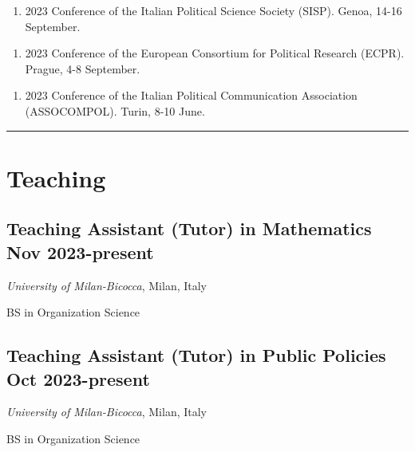 \documentclass[10pt,]{article}
\providecommand{\tightlist}{%
  \setlength{\itemsep}{0pt}\setlength{\parskip}{0pt}}
\renewenvironment{itemize}{
  \begin{list}{}{
    \setlength{\leftmargin}{1.5em}
  }
}{
  \end{list}
}
\begin{document}
\begin{enumerate}
\def\labelenumi{\arabic{enumi}.}
\setcounter{enumi}{2}
\tightlist
\item
  2023 Conference of the Italian Political Science Society (SISP).
  Genoa, 14-16 September.
\end{enumerate}

\begin{enumerate}
\def\labelenumi{\arabic{enumi}.}
\setcounter{enumi}{1}
\tightlist
\item
  2023 Conference of the European Consortium for Political Research
  (ECPR). Prague, 4-8 September.
\end{enumerate}

\begin{enumerate}
\def\labelenumi{\arabic{enumi}.}
\tightlist
\item
  2023 Conference of the Italian Political Communication Association
  (ASSOCOMPOL). Turin, 8-10 June.
\end{enumerate}

\bigskip \hrule

\section{Teaching}\label{teaching}

\subsection{\texorpdfstring{Teaching Assistant (Tutor) in Mathematics
\hfill Nov
2023-present}{Teaching Assistant (Tutor) in Mathematics Nov 2023-present}}\label{teaching-assistant-tutor-in-mathematics-nov-2023-present}

\begin{itemize}
\tightlist
\item
  \emph{University of Milan-Bicocca}, Milan, Italy
\item
  BS in Organization Science
\end{itemize}

\subsection{\texorpdfstring{Teaching Assistant (Tutor) in Public
Policies \hfill Oct
2023-present}{Teaching Assistant (Tutor) in Public Policies Oct 2023-present}}\label{teaching-assistant-tutor-in-public-policies-oct-2023-present}

\begin{itemize}
\tightlist
\item
  \emph{University of Milan-Bicocca}, Milan, Italy
\item
  BS in Organization Science
\end{itemize}
\end{document}

